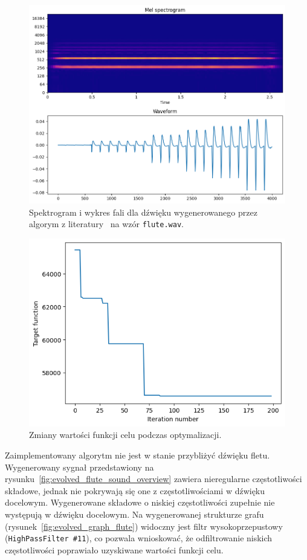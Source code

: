 \begin{figure}[H]
    \centering
    \includegraphics[width=0.7\linewidth]{rys06/macret_evolved_flute.png}
    \caption{
      Spektrogram i wykres fali dla dźwięku
      wygenerowanego przez algorym z literatury~\cite{evolutionary_puredata}
      na wzór \texttt{flute.wav}.
    }\label{fig:evolved_literature_flute}
\end{figure}

\begin{figure}[H]
    \centering
    \includegraphics[width=0.6\linewidth]{rys06/flute_target_fun_values.png}
    \caption{
      Zmiany wartości funkcji celu podczas optymalizacji.
    }\label{fig:flute_target_fun_values}
\end{figure}


Zaimplementowany algorytm nie jest w stanie przybliżyć dźwięku fletu.
Wygenerowany sygnał przedstawiony na rysunku~\ref{fig:evolved_flute_sound_overview}
zawiera nieregularne częstotliwości składowe,
jednak nie pokrywają się one z częstotliwościami w dźwięku docelowym.
Wygenerowane składowe o niskiej częstotliwości zupełnie nie występują w dźwięku docelowym.
Na wygenerowanej strukturze grafu (rysunek~\ref{fig:evolved_graph_flute}) widoczny
jest filtr wysokoprzepustowy (\texttt{HighPassFilter \#11}), co pozwala wnioskować,
że odfiltrowanie niskich częstotliwości poprawiało uzyskiwane wartości funkcji celu.

